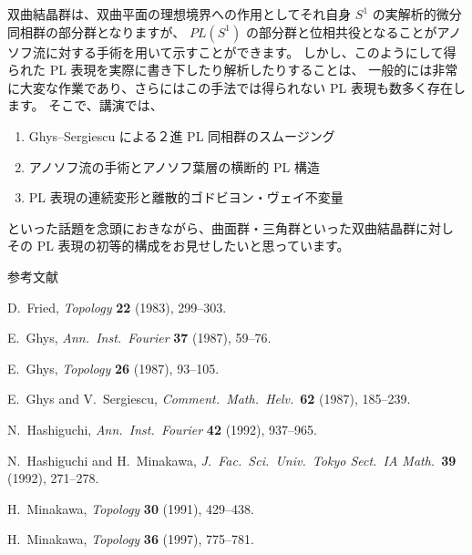 \documentclass[uplatex,dvipdfmx]{jlreq}
\begin{document}
双曲結晶群は、双曲平面の理想境界への作用としてそれ自身 $S^1$ の実解析的微分同相群の部分群となりますが、
$PL(S^1)$ の部分群と位相共役となることがアノソフ流に対する手術を用いて示すことができます。
しかし、このようにして得られた PL 表現を実際に書き下したり解析したりすることは、
一般的には非常に大変な作業であり、さらにはこの手法では得られない PL 表現も数多く存在します。
そこで、講演では、
\begin{enumerate}
  \setlength{\itemsep}{2pt}
  \item[(1)] Ghys--Sergiescu による２進 PL 同相群のスムージング
  \item[(2)] アノソフ流の手術とアノソフ葉層の横断的 PL 構造
  \item[(3)] PL 表現の連続変形と離散的ゴドビヨン・ヴェイ不変量
\end{enumerate}
といった話題を念頭におきながら、曲面群・三角群といった双曲結晶群に対し
その PL 表現の初等的構成をお見せしたいと思っています。

\medskip

\begin{center}
  \textsc{参考文献}
\end{center}

\begin{enumerate}[{[1]}]
  \setlength{\itemsep}{3pt}
  \item D.~Fried, \textit{Topology} \textbf{22} (1983), 299--303.
  \item E.~Ghys, \textit{Ann.\ Inst.\ Fourier} \textbf{37} (1987), 59--76.
  \item E.~Ghys, \textit{Topology} \textbf{26} (1987), 93--105.
  \item E.~Ghys and V.~Sergiescu,
        \textit{Comment.\ Math.\ Helv.}\ \textbf{62} (1987), 185--239.
  \item N.~Hashiguchi, \textit{Ann.\ Inst.\ Fourier} \textbf{42} (1992), 937--965.
  \item N.~Hashiguchi and H.~Minakawa,
        \textit{J.\ Fac.\ Sci.\ Univ.\ Tokyo Sect.\ IA Math.}\ \textbf{39} (1992), 271--278.
  \item H.~Minakawa, \textit{Topology} \textbf{30} (1991), 429--438.
  \item H.~Minakawa, \textit{Topology} \textbf{36} (1997), 775--781.
\end{enumerate}
\end{document}
